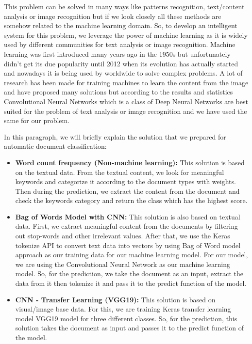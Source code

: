\newline
\par
This problem can be solved in many ways like patterns recognition, text/content analysis or image recognition but if we look closely all these methods are somehow related to the machine learning domain. So, to develop an intelligent system for this problem, we leverage the power of machine learning as it is widely used by different communities for text analysis or image recognition. Machine learning was first introduced many years ago in the 1950s but unfortunately didn't get its due popularity until 2012 when its evolution has actually started and nowadays it is being used by worldwide to solve complex problems. A lot of research has been made for training machines to learn the content from the image and have proposed many solutions but according to the results and statistics Convolutional Neural Networks which is a class of Deep Neural Networks are best suited for the problem of text analysis or image recognition and we have used the same for our problem.
\newline
\par
In this paragraph, we will briefly explain the solution that we prepared for automatic document classification:
\begin{itemize}
  \item \textbf{Word count frequency (Non-machine learning):} This solution is based on the textual data. From the textual content, we look for meaningful keywords and categorize it according to the document types with weights. Then during the prediction, we extract the content from the document and check the keywords category and return the class which has the highest score.
  
  \item  \textbf{Bag of Words Model with CNN:} This solution is also based on textual data. First, we extract meaningful content from the documents by filtering out stop-words and other irrelevant values. After that, we use the Keras tokenize API \cite{keras_tokenizer} to convert text data into vectors by using Bag of Word model approach \cite{bow} \cite{bow_example} as our training data for our machine learning model. For our model, we are using the Convolutional Neural Network as our machine learning model. So, for the prediction, we take the document as an input, extract the data from it then tokenize it and pass it to the predict function of the model.
  
  \item \textbf{CNN - Transfer Learning (VGG19):} This solution is based on visual/image base data. For this, we are training Keras transfer learning model VGG19 model for three different classes. So, for the 
  prediction, this solution takes the document as input and passes it to the predict function of the model.
\end{itemize}
